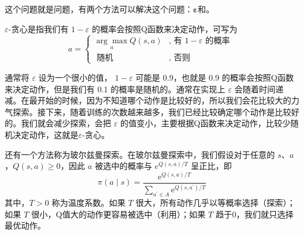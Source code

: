 这个问题就是问题，有两个方法可以解决这个问题：$\pmb{\varepsilon}$和。

$\varepsilon$-贪心是指我们有 $1-\varepsilon$ 的概率会按照Q函数来决定动作，可写为
\begin{equation}
    \label{eq:}
    a=
    \begin{cases}
        \underset{a}{\arg \max} Q(s, a) & \text {, 有 } 1-\varepsilon \text { 的概率 } \\
        \text { 随机} & \text {, 否则 }  
    \end{cases}
\end{equation}

通常将 $\varepsilon$ 设为一个很小的值， $1-\varepsilon$ 可能是 0.9，也就是 0.9 的概率会按照Q函数来决定动作，但是我们有 0.1 的概率是随机的。通常在实现上 $\varepsilon$ 会随着时间递减。在最开始的时候，因为不知道哪个动作是比较好的，所以我们会花比较大的力气探索。接下来，随着训练的次数越来越多，我们已经比较确定哪个动作是比较好的。我们就会减少探索，会把 $\varepsilon$ 的值变小，主要根据Q函数来决定动作，比较少随机决定动作，这就是$\varepsilon$-贪心。

还有一个方法称为玻尔兹曼探索。在玻尔兹曼探索中，我们假设对于任意的 $s$、$a$，$Q(s,a) \geqslant 0$，因此 $a$ 被选中的概率与 $e^{Q(s, a) / T}$ 呈正比，即
\begin{equation}
    \label{eq:}
    \pi(a \mid s)=\frac{\mathrm{e}^{Q(s, a) / T}}{\sum_{a^{\prime} \in A} \mathrm{e}^{Q\left(s, a^{\prime}\right) / T}}
\end{equation}
其中，$T>0$ 称为温度系数。如果 $T$ 很大，所有动作几乎以等概率选择（探索）；如果 $T$ 很小，Q值大的动作更容易被选中（利用）；如果 $T$ 趋于0，我们就只选择最优动作。




